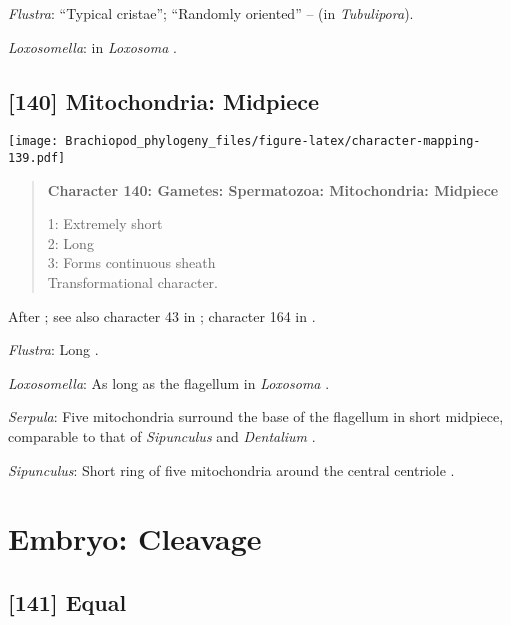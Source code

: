 \documentclass[openany]{book}
\theoremstyle{definition}
\theoremstyle{definition}
\theoremstyle{definition}
\theoremstyle{remark}
\begin{document}
\hypertarget{Flustra-coding-139}{}
\emph{Flustra}: ``Typical cristae''; ``Randomly oriented'' --
\citet{Franzen1984} (in \emph{Tubulipora}).

\hypertarget{Loxosomella-coding-139}{}
\emph{Loxosomella}: in \emph{Loxosoma} \citep{Franzen2000}.

\subsection*{{[}140{]} Mitochondria:
Midpiece}\label{mitochondria-midpiece}

\texttt{[image: Brachiopod\_phylogeny\_files/figure-latex/character-mapping-139.pdf]}

\begin{quote}
\textbf{Character 140: Gametes: Spermatozoa: Mitochondria: Midpiece}

1: Extremely short\\
2: Long\\
3: Forms continuous sheath\\
Transformational character.
\end{quote}

After \citet{Smith2012}; see also character 43 in \citet{Ponder1997};
character 164 in \citet{Giribet2002}.

\hypertarget{Flustra-coding-140}{}
\emph{Flustra}: Long \citep{Franzen1981}.

\hypertarget{Loxosomella-coding-140}{}
\emph{Loxosomella}: As long as the flagellum in \emph{Loxosoma}
\citep{Franzen2000}.

\hypertarget{Serpula-coding-140}{}
\emph{Serpula}: Five mitochondria surround the base of the flagellum in
short midpiece, comparable to that of \emph{Sipunculus} and
\emph{Dentalium} \citep{Gherardi2011}.

\hypertarget{Sipunculus-coding-140}{}
\emph{Sipunculus}: Short ring of five mitochondria around the central
centriole \citep{Rice1993}.

\section{Embryo: Cleavage}\label{embryo-cleavage}

\subsection*{{[}141{]} Equal}\label{equal}
\end{document}
